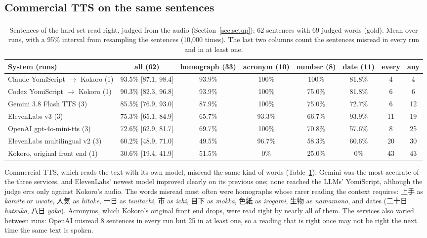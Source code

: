 \documentclass[11pt,a4paper]{article}
\newcommand{\provisional}{\textsuperscript{\textdagger}}
\begin{document}
\subsection{Commercial TTS on the same sentences}\label{sec:commercial}

\begin{table}[t]
\centering\small
\caption{Sentences of the hard set read right, judged from the audio (Section~\ref{sec:setup}); 62 sentences with 69
judged words (gold\provisional). Mean over runs, with a 95\% interval from resampling the sentences (10{,}000 times).
The last two columns count the sentences misread in every run and in at least one.}
\label{tab:commercial}
\setlength{\tabcolsep}{4pt}
\begin{tabular}{lccccccc}
\toprule
System (runs) & all (62) & homograph (33) & acronym (10) & number (8) & date (11) & every & any\\
\midrule
Claude YomiScript $\to$ Kokoro (1) & 93.5\% [87.1, 98.4] & 93.9\% & 100\% & 100\% & 81.8\% & 4 & 4\\
Codex YomiScript $\to$ Kokoro (1) & 90.3\% [82.3, 96.8] & 93.9\% & 100\% & 75.0\% & 81.8\% & 6 & 6\\
Gemini 3.8 Flash TTS (3) & 85.5\% [76.9, 93.0] & 87.9\% & 100\% & 75.0\% & 72.7\% & 6 & 12\\
ElevenLabs v3 (3) & 75.3\% [65.1, 84.9] & 65.7\% & 93.3\% & 66.7\% & 93.9\% & 11 & 19\\
OpenAI gpt-4o-mini-tts (3) & 72.6\% [62.9, 81.7] & 69.7\% & 100\% & 70.8\% & 57.6\% & 8 & 25\\
ElevenLabs multilingual v2 (3) & 60.2\% [48.9, 71.0] & 49.5\% & 96.7\% & 58.3\% & 60.6\% & 20 & 30\\
Kokoro, original front end (1) & 30.6\% [19.4, 41.9] & 51.5\% & 0\% & 25.0\% & 0\% & 43 & 43\\
\bottomrule
\end{tabular}
\end{table}

Commercial TTS, which reads the text with its own model, misread the same kind of words (Table~\ref{tab:commercial}).
Gemini was the most accurate of the three services, and ElevenLabs' newest model improved clearly on its previous one;
none reached the LLMs' YomiScript, although the judge errs only against Kokoro's audio. The words misread most often
were homographs whose rarer reading the context requires: 上手 as \emph{kamite} or \emph{uwate}, 人気 as \emph{hitoke},
一日 as \emph{tsuitachi}, 市 as \emph{ichi}, 目下 as \emph{mokka}, 色紙 as \emph{irogami}, 生物 as \emph{namamono},
and dates (二十日 \emph{hatsuka}, 八日 \emph{yōka}). Acronyms, which Kokoro's original front end drops, were read right
by nearly all of them. The services also varied between runs: OpenAI misread 8 sentences in every run but 25 in at
least one, so a reading that is right once may not be right the next time the same text is spoken.
\end{document}
